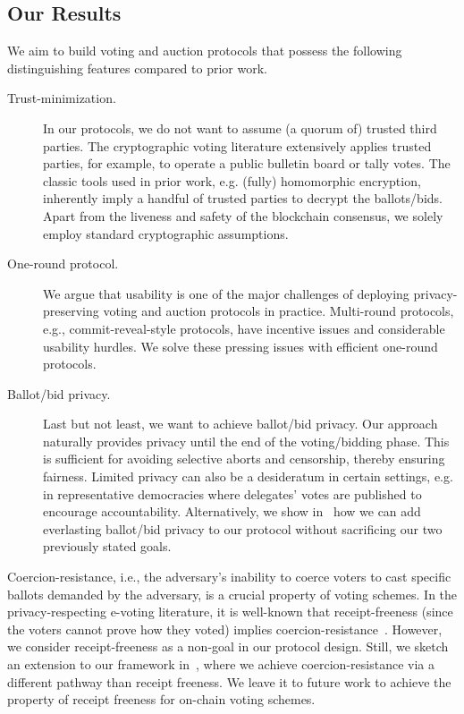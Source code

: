 \subsection{Our Results}
We aim to build voting and auction protocols that possess the following distinguishing features compared to prior work.
\begin{description}
    \item[Trust-minimization.] In our protocols, we do not want to assume (a quorum of) trusted third parties. The cryptographic voting literature extensively applies trusted parties, for example, to operate a public bulletin board or tally votes. The classic tools used in prior work, e.g. (fully) homomorphic encryption, inherently imply a handful of trusted parties to decrypt the ballots/bids. Apart from the liveness and safety of the blockchain consensus, we solely employ standard cryptographic assumptions.

    \item[One-round protocol.] We argue that usability is one of the major challenges of deploying privacy-preserving voting and auction protocols in practice. Multi-round protocols, e.g., commit-reveal-style protocols, have incentive issues and considerable usability hurdles. We solve these pressing issues with efficient one-round protocols.  

    \item[Ballot/bid privacy.] Last but not least, we want to achieve ballot/bid privacy. Our approach naturally provides privacy until the end of the voting/bidding phase. This is sufficient for avoiding selective aborts and censorship, thereby ensuring fairness. Limited privacy can also be a desideratum in certain settings, e.g. in representative democracies where delegates' votes are published to encourage accountability.
    Alternatively, we show in~ how we can add everlasting ballot/bid privacy to our protocol without sacrificing our two previously stated goals. 
\end{description}

Coercion-resistance, i.e., the adversary's inability to coerce voters to cast specific ballots demanded by the adversary, is a crucial property of voting schemes. In the privacy-respecting e-voting literature, it is well-known that receipt-freeness (since the voters cannot prove how they voted) implies coercion-resistance~\cite{STOC:BenTui94}. However, we consider receipt-freeness as a non-goal in our protocol design. Still, we sketch an extension to our framework in~, where we achieve coercion-resistance via a different pathway than receipt freeness. We leave it to future work to achieve the property of receipt freeness for on-chain voting schemes.%

